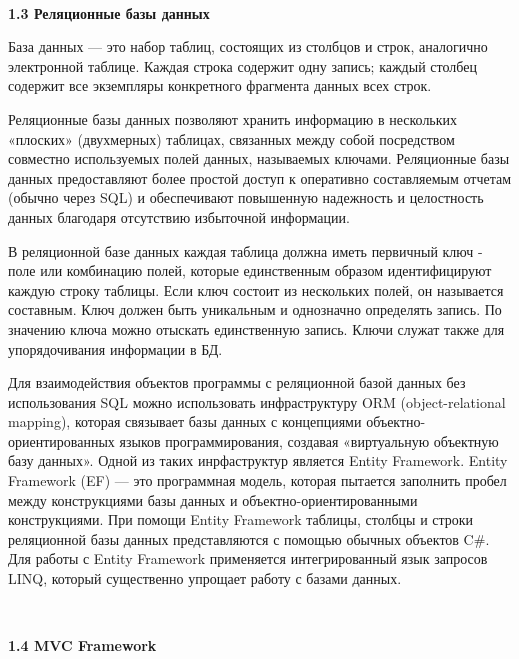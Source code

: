 \documentclass[14pt,a4paper]{extreport}
\begin{document}
	~\\

	\textbf{1.3 Реляционные базы данных}

	\parindent=1cm База данных — это набор таблиц, состоящих из столбцов и строк, аналогично электронной таблице. Каждая строка содержит одну запись; каждый столбец содержит все экземпляры конкретного фрагмента данных всех строк.\par
	Реляционные базы данных позволяют хранить информацию в нескольких «плоских» (двухмерных) таблицах, связанных между собой посредством совместно используемых полей данных, называемых ключами. Реляционные базы данных предоставляют более простой доступ к оперативно составляемым отчетам (обычно через SQL) и обеспечивают повышенную надежность и целостность данных благодаря отсутствию избыточной информации.\par
	В реляционной базе данных каждая таблица должна иметь первичный ключ - поле или комбинацию полей, которые единственным образом идентифицируют каждую строку таблицы. Если ключ состоит из нескольких полей, он называется составным. Ключ должен быть уникальным и однозначно определять запись. По значению ключа можно отыскать единственную запись. Ключи служат также для упорядочивания информации в БД.\par
	Для взаимодействия объектов программы с реляционной базой данных без использования SQL можно использовать инфраструктуру ORM (object-relational mapping), которая связывает базы данных с концепциями объектно-ориентированных языков программирования, создавая «виртуальную объектную базу данных». Одной из таких инрфаструктур является Entity Framework. Entity Framework (EF) — это программная модель, которая пытается заполнить пробел между конструкциями базы данных и объектно-ориентированными конструкциями. При помощи Entity Framework таблицы, столбцы и строки реляционной базы данных представляются с помощью обычных объектов C\#. Для работы с Entity Framework применяется интегрированный язык запросов LINQ, который существенно упрощает работу с базами данных.\par

	~\\

	\textbf{1.4 MVC Framework}
	
\end{document}
